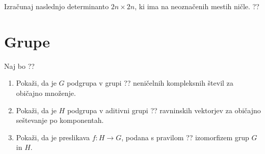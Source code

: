 \documentclass[a4paper,12pt]{article}
\begin{document}
Izračunaj naslednjo determinanto \(2n \times 2n\), ki ima na neoznačenih mestih ničle.
??
%
%

\section*{Grupe}

Naj bo
??
\begin{enumerate}
\item
Pokaži, da je \(G\) podgrupa v grupi ??
neničelnih kompleksnih števil za običajno množenje.

\item
Pokaži, da je \(H\) podgrupa v aditivni grupi ??
ravninskih vektorjev za običajno seštevanje po komponentah.

\item
Pokaži, da je preslikava \(f:H\to G\), podana s pravilom
??
izomorfizem grup \(G\) in \(H\).
\end{enumerate}
\end{document}
